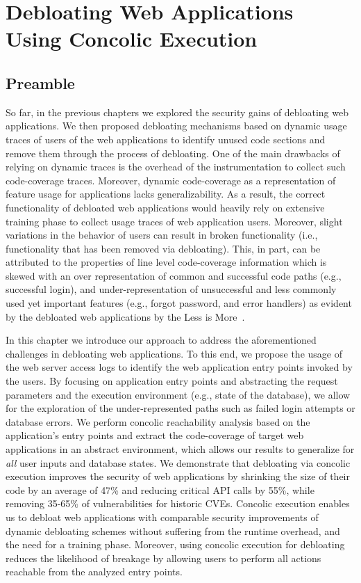 \chapter{Debloating Web Applications Using Concolic Execution}
\label{chap:ad}
\section*{Preamble}

So far, in the previous chapters we explored the security gains of debloating web applications. 
We then proposed debloating mechanisms based on dynamic usage traces of users of the web applications to identify unused code sections and remove them through the process of debloating. 
One of the main drawbacks of relying on dynamic traces is the overhead of the instrumentation to collect such code-coverage traces. 
Moreover, dynamic code-coverage as a representation of feature usage for applications lacks generalizability. 
As a result, the correct functionality of debloated web applications would heavily rely on extensive training phase to collect usage traces of web application users. 
Moreover, slight variations in the behavior of users can result in broken functionality (i.e., functionality that has been removed via debloating). 
This, in part, can be attributed to the properties of line level code-coverage information which is skewed with an over representation of common and successful code paths (e.g., successful login), and under-representation of unsuccessful and less commonly used yet important features (e.g., forgot password, and error handlers) as evident by the debloated web applications by the Less is More~\cite{azad2019less}.

In this chapter we introduce our approach to address the aforementioned challenges in debloating web applications. 
To this end, we propose the usage of the web server access logs to identify the web application entry points invoked by the users. 
By focusing on application entry points and abstracting the request parameters and the execution environment (e.g., state of the database), we allow for the exploration of the under-represented paths such as failed login attempts or database errors. 
We perform concolic reachability analysis based on the application's entry points and extract the code-coverage of target web applications in an abstract environment, which allows our results to generalize for \emph{all} user inputs and database states. 
We demonstrate that debloating via concolic execution improves the security of web applications by shrinking the size of their code by an average of 47\% and reducing critical API calls by 55\%, while removing 35-65\% of vulnerabilities for historic CVEs. 
Concolic execution enables us to debloat web applications with comparable security improvements of dynamic debloating schemes without suffering from the runtime overhead, and the need for a training phase. 
Moreover, using concolic execution for debloating reduces the likelihood of breakage by allowing users to perform all actions reachable from the analyzed entry points.

